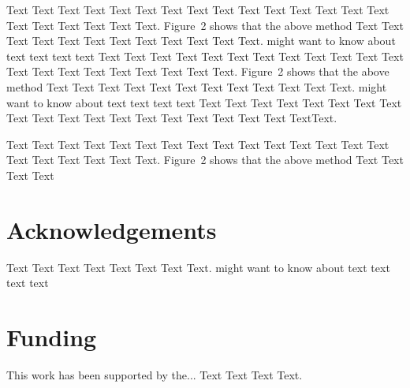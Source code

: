 \documentclass{bioinfo}
\begin{document}
Text Text Text Text Text Text Text Text Text Text Text Text Text
Text Text Text Text Text Text Text Text.
Figure~2\vphantom{\ref{fig:02}} shows\vadjust{\pagebreak} that the
above method  Text Text Text Text Text Text Text Text Text Text
Text Text.  \citealp{Boffelli03} might want to know about text
text text text Text Text Text Text Text Text  Text Text Text Text
Text Text Text Text Text Text Text Text Text Text Text.
Figure~2\vphantom{\ref{fig:02}} shows that the above method  Text
Text Text Text Text Text Text Text Text Text  Text Text.
\citealp{Boffelli03} might want to know about text text text text
Text Text Text Text Text Text  Text Text Text Text Text Text Text
Text Text Text Text Text Text Text\break Text.


Text Text Text Text Text Text  Text Text Text Text Text Text Text
Text Text  Text Text Text Text Text Text.
Figure~2\vphantom{\ref{fig:02}} shows that the above method  Text
Text Text Text\vspace*{-10pt}


\section*{Acknowledgements}

Text Text Text Text Text Text  Text Text.  \citealp{Boffelli03} might want to know about  text
text text text\vspace*{-12pt}

\section*{Funding}

This work has been supported by the... Text Text  Text Text.\vspace*{-12pt}

%
%
%
%
%
%
%
%
%
\end{document}
